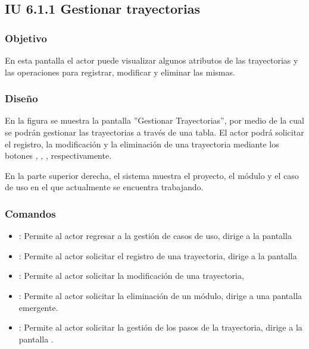 \subsection{IU 6.1.1 Gestionar trayectorias}

\subsubsection{Objetivo}
	En esta pantalla el actor puede visualizar algunos atributos de las trayectorias y las operaciones para registrar, modificar y eliminar las mismas.
\subsubsection{Diseño}
	En la figura  se muestra la pantalla ''Gestionar Trayectorias'', por medio de la cual se podrán gestionar las trayectorias a través de una tabla. El actor podrá solicitar el registro, la modificación y la eliminación de una trayectoria mediante los botones , \editar, \eliminar, respectivamente.
	
	En la parte superior derecha, el sistema muestra el proyecto, el módulo y el caso de uso en el que actualmente se encuentra trabajando.

\subsubsection{Comandos}
\begin{itemize}
	\item {}: Permite al actor regresar a la gestión de casos de uso, dirige a la pantalla 
	\item {}: Permite al actor solicitar el registro de una trayectoria, dirige a la pantalla 
	\item \editar [Modificar]: Permite al actor solicitar la modificación de una trayectoria, 
	\item \eliminar [Eliminar]: Permite al actor solicitar la eliminación de un módulo, dirige a una pantalla emergente.
	\item {}: Permite al actor solicitar la gestión de los pasos de la trayectoria, dirige a la pantalla .
\end{itemize}

